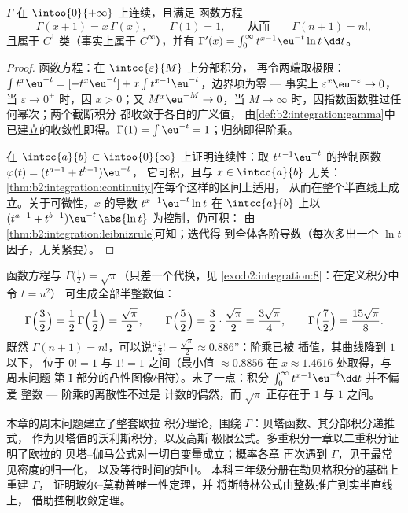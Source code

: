 \begin{theorem}\label{thm:b2:integration:gammaprops}
$\Gamma$ 在 $\intoo{0}{+\infty}$ 上连续，且满足
函数方程
\[
\Gamma(x + 1) = x\,\Gamma(x),
\qquad \Gamma(1) = 1,
\qquad\text{从而}\qquad \Gamma(n + 1) = n! ,
\]
且属于 $C^1$ 类（事实上属于 $C^\infty$），并有 $\Gamma'(x) =
\int_0^\infty t^{x-1}\eu^{-t}\ln t\,\dd t$。
\end{theorem}

\begin{proof}
函数方程：在 $\intcc{\varepsilon}{M}$ 上分部积分，
再令两端取极限：$\int t^{x}\eu^{-t} = [-t^x\eu^{-t}] + x\int
t^{x-1}\eu^{-t}$，边界项为零 --- 事实上
$\varepsilon^x\eu^{-\varepsilon} \to 0$，当 $\varepsilon \to
0^+$ 时，因 $x > 0$；又 $M^x\eu^{-M} \to 0$，当 $M \to \infty$
时，因指数函数胜过任何幂次；两个截断积分
都收敛于各自的广义值，
由\cref{def:b2:integration:gamma}中已建立的收敛性即得。$\Gamma(1) = \int
\eu^{-t} = 1$；归纳即得阶乘。

在 $\intcc{a}{b} \subset \intoo{0}{\infty}$ 上证明连续性：取
$t^{x-1}\eu^{-t}$ 的控制函数 $\varphi(t) = (t^{a-1} + t^{b-1})\eu^{-t}$，
它可积，且与 $x \in \intcc{a}{b}$ 无关：
\cref{thm:b2:integration:continuity}在每个这样的区间上适用，
从而在整个半直线上成立。关于可微性，$x$ 的导数
$t^{x-1}\eu^{-t}\ln t$ 在 $\intcc{a}{b}$ 上以 $(t^{a-1}
+ t^{b-1})\eu^{-t}\,\abs{\ln t}$ 为控制，仍可积：
由\cref{thm:b2:integration:leibnizrule}可知；迭代得
到全体各阶导数（每次多出一个 $\ln t$ 因子，无关紧要）。
\end{proof}

\begin{example}[半整数阶乘]\label{ex:b2:integration:halffactorial}
函数方程与 $\Gamma\bigl(\frac12\bigr) =
\sqrt\pi$（只差一个代换，见
\cref{exo:b2:integration:8}：在定义积分中令 $t = u^2$）
可生成全部半整数值：
\[
\Gamma\Bigl(\frac32\Bigr) = \frac12\,\Gamma\Bigl(\frac12\Bigr)
= \frac{\sqrt\pi}{2},
\qquad
\Gamma\Bigl(\frac52\Bigr) = \frac32\cdot\frac{\sqrt\pi}{2}
= \frac{3\sqrt\pi}{4},
\qquad
\Gamma\Bigl(\frac72\Bigr) = \frac{15\sqrt\pi}{8} .
\]
既然 $\Gamma(n+1) = n!$，可以说“$\frac12! =
\frac{\sqrt\pi}{2} \approx 0.886$”：阶乘已被
插值，其曲线降到 $1$ 以下，
位于 $0! = 1$ 与 $1! = 1$ 之间（最小值 $\approx 0.8856$ 在
$x \approx 1.4616$ 处取得，与周末问题
第 I 部分的凸性图像相符）。末了一点：积分
$\int_0^\infty t^{x-1}\eu^{-t}\dd t$ 并不偏爱
整数 --- 阶乘的离散性不过是
计数的偶然，而 $\sqrt\pi$ 正存在于 $1$ 与 $1$ 之间。
\end{example}

\begin{remark}
本章的周末问题建立了整套欧拉
积分理论，围绕 $\Gamma$：贝塔函数、其分部积分递推式，
作为贝塔值的沃利斯积分，以及高斯
极限公式。多重积分一章以二重积分证明了欧拉的
贝塔–伽马公式对一切自变量成立；概率各章
再次遇到 $\Gamma$，见于最常见密度的归一化，
以及等待时间的矩中。
本科三年级分册在勒贝格积分的基础上重建 $\Gamma$，
证明玻尔–莫勒普唯一性定理，并
将斯特林公式由整数推广到实半直线上，
借助控制收敛定理。
\end{remark}

